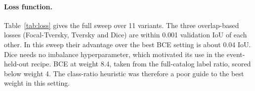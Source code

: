 \begin{table}[!htbp]
\caption{Two-stage and hand-only DeepLabV3+/ResNet-50 runs, seed 42,
evaluated on the standard hand test split.}
\label{tab:two-stage}
\centering\small

\end{table}

\paragraph{Loss function.}
Table~\ref{tab:loss} gives the full sweep over 11 variants. The three
overlap-based losses (Focal-Tversky, Tversky and Dice) are within 0.001
validation IoU of each other. In this sweep their advantage over the
best BCE setting is about 0.04 IoU. Dice needs no imbalance
hyperparameter, which motivated its use in the event-held-out recipe.
BCE at weight 8.4, taken from the full-catalog label ratio, scored below
weight 4. The class-ratio heuristic was therefore a poor guide to the
best weight in this setting.

\begin{table}[!htbp]
\caption{Loss sweep on the 89-chip validation split using
DeepLabV3+/ResNet-34, seed 42, one run per variant on a Colab T4,
with a 40-epoch limit and early stopping (patience 8).}
\label{tab:loss}
\centering\small

\end{table}
